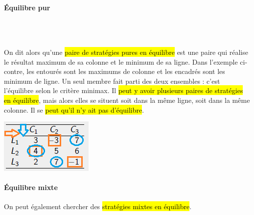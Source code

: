 \documentclass[a4paper, 12pt]{article}
\newcommand{\alinea}{
\hspace*{0.5cm}}
\newcommand{\red}[1]{
	\textcolor{red}{#1}}
\begin{document}
		\paragraph{\'Equilibre pur}~\\~\\
			\begin{minipage}{0.74\textwidth}
				\alinea On dit alors qu'une \red{\hl{paire de stratégies pures en équilibre}} est une paire qui réalise le 
				résultat maximum de 
				sa colonne et le minimum de sa ligne. Dans l'exemple ci-contre, les entourés sont les maximums de colonne et les encadrés 
				sont les minimum de ligne. Un seul membre fait parti des deux ensembles : c'est l'équilibre selon le critère minimax.
				Il \hl{peut y avoir plusieurs paires de stratégies en équilibre}, mais alors elles se situent soit dans la même ligne, soit
				dans la même colonne. Il se \hl{peut qu'il n'y ait pas d'équilibre}.
			\end{minipage}\hfill
			\begin{minipage}{0.2\textwidth}
				\includegraphics[width=\textwidth]{Images/minimax}
			\end{minipage}
		\paragraph{\'Equilibre mixte}
			\alinea On peut également chercher des \red{\hl{stratégies mixtes en équilibre}}. 
\end{document}
